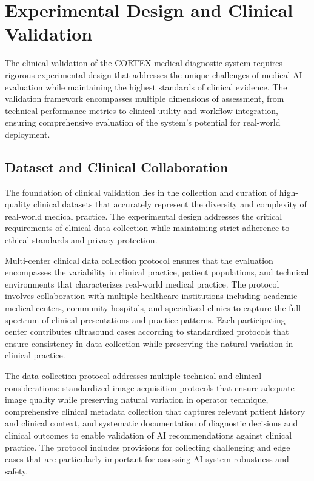 \section{Experimental Design and Clinical Validation}

The clinical validation of the CORTEX medical diagnostic system requires rigorous experimental design that addresses the unique challenges of medical AI evaluation while maintaining the highest standards of clinical evidence. The validation framework encompasses multiple dimensions of assessment, from technical performance metrics to clinical utility and workflow integration, ensuring comprehensive evaluation of the system's potential for real-world deployment.

\subsection{Dataset and Clinical Collaboration}

The foundation of clinical validation lies in the collection and curation of high-quality clinical datasets that accurately represent the diversity and complexity of real-world medical practice. The experimental design addresses the critical requirements of clinical data collection while maintaining strict adherence to ethical standards and privacy protection.

Multi-center clinical data collection protocol ensures that the evaluation encompasses the variability in clinical practice, patient populations, and technical environments that characterizes real-world medical practice. The protocol involves collaboration with multiple healthcare institutions including academic medical centers, community hospitals, and specialized clinics to capture the full spectrum of clinical presentations and practice patterns. Each participating center contributes ultrasound cases according to standardized protocols that ensure consistency in data collection while preserving the natural variation in clinical practice.

The data collection protocol addresses multiple technical and clinical considerations: standardized image acquisition protocols that ensure adequate image quality while preserving natural variation in operator technique, comprehensive clinical metadata collection that captures relevant patient history and clinical context, and systematic documentation of diagnostic decisions and clinical outcomes to enable validation of AI recommendations against clinical practice. The protocol includes provisions for collecting challenging and edge cases that are particularly important for assessing AI system robustness and safety.


